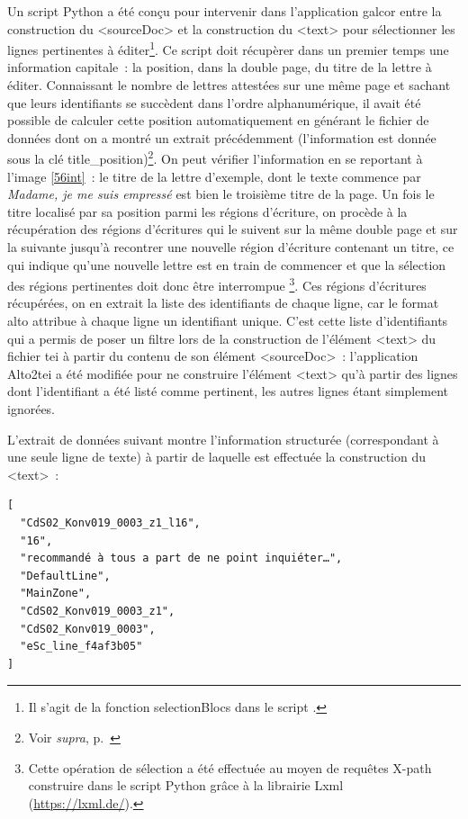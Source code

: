 \documentclass[a4paper,12pt,twoside]{book}
\begin{document}
			Un script Python a été conçu pour intervenir dans l'application \gls{galcor} entre la construction du \textsf{<sourceDoc>} et la construction du \textsf{<text>} pour sélectionner les lignes pertinentes à éditer\footnote{Il s'agit de la fonction \textsf{selectionBlocs} dans le script \cite{biayCdsFonctionsPy2022}.}. Ce script doit récupèrer dans un premier temps une information capitale~: la position, dans la double page, du titre de la lettre à éditer. Connaissant le nombre de lettres attestées sur une même page et sachant que leurs identifiants se succèdent dans l'ordre alphanumérique, il avait été possible de calculer cette position automatiquement en générant le fichier de données dont on a montré un extrait précédemment (l'information est donnée sous la clé \textsf{title\_position})\footnote{Voir \textit{supra}, p.~\pageref{json-CdS-b1-06pa}}. On peut vérifier l'information en se reportant à l'image \ref{56int}~: le titre de la lettre d'exemple, dont le texte commence par \textit{Madame, je me suis empressé} est bien le troisième titre de la page. Un fois le titre localisé par sa position parmi les régions d'écriture, on procède à la récupération des régions d'écritures qui le suivent sur la même double page et sur la suivante jusqu'à recontrer une nouvelle région d'écriture contenant un titre, ce qui indique qu'une nouvelle lettre est en train de commencer et que la sélection des régions pertinentes doit donc être interrompue
			\footnote{Cette opération de sélection a été effectuée au moyen de requêtes X-path construire dans le script Python grâce à la librairie Lxml (\url{https://lxml.de/}).}.
			Ces régions d'écritures récupérées, on en extrait la liste des identifiants de chaque ligne, car le format \gls{alto} attribue à chaque ligne un identifiant unique. C'est cette liste d'identifiants qui a permis de poser un filtre lors de la construction de l'élément \textsf{<text>} du fichier \gls{tei} à partir du contenu de son élément \textsf{<sourceDoc>}~: l'application Alto2tei a été modifiée pour ne construire l'élément \textsf{<text>} qu'à partir des lignes dont l'identifiant a été listé comme pertinent, les autres lignes étant simplement ignorées.
			
			L'extrait de données suivant montre l'information structurée (correspondant à une seule ligne de texte) à partir de laquelle est effectuée la construction du \textsf{<text>}~:
			
			\begin{verbatim}
[
  "CdS02_Konv019_0003_z1_l16",
  "16", 
  "recommandé à tous a part de ne point inquiéter…", 
  "DefaultLine", 
  "MainZone", 
  "CdS02_Konv019_0003_z1", 
  "CdS02_Konv019_0003", 
  "eSc_line_f4af3b05"
]
			\end{verbatim}
			
\end{document}
